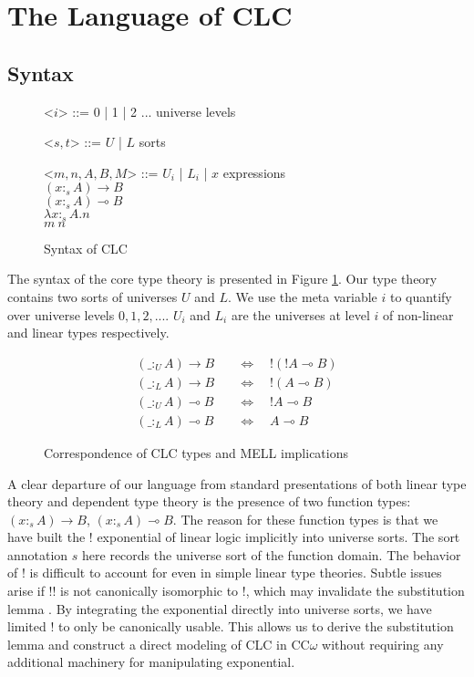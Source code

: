 \documentclass[sigplan,screen,review,anonymous]{acmart}
\newcommand{\indalt}[1][2]{\\\hspace*{-1.2em}\textbar\quad}
\newcommand{\utype}{:_{\scriptscriptstyle U}}
\newcommand{\ltype}{:_{\scriptscriptstyle L}}
\begin{document}
\section{The Language of CLC}
\subsection{Syntax}
\begin{figure}[h]
  \caption{Syntax of CLC}
  \begin{grammar}
    <$i$> ::= 0 | 1 | 2 ... \phantom{* |} \hspace*{3em} universe levels

    <$s, t$> ::= $U$ | $L$ \phantom{| $x$} \hspace*{4.6em} sorts

    <$m, n, A, B, M$> ::= $U_i$ | $L_i$ | $x$ \hspace*{4.2em} expressions
    \indalt $(x :_s A) \rightarrow B$
    \indalt $(x :_s A) \multimap B$
    \indalt $\lambda x :_s A. n$
    \indalt $m\ n$
  \end{grammar}
  \Description{}
  \label{syntax1}
\end{figure}

The syntax of the core type theory is presented in Figure \ref{syntax1}. Our type theory contains two sorts of universes $U$ and $L$. We use the meta variable $i$ to quantify over universe levels $0, 1, 2, ...$. $U_i$ and $L_i$ are the universes at level $i$ of non-linear and linear types respectively.
\begin{figure}[h]
  \caption{Correspondence of CLC types and MELL implications}
  \Description{}
  \begin{align}
    (\_ \utype A) \rightarrow B \quad & \Leftrightarrow \quad !(!A \multimap B) \\
    (\_ \ltype A) \rightarrow B \quad & \Leftrightarrow \quad !(A \multimap B)  \\
    (\_ \utype A) \multimap B \quad   & \Leftrightarrow \quad !A \multimap B    \\
    (\_ \ltype A) \multimap B \quad   & \Leftrightarrow \quad A \multimap B
  \end{align}
  \label{correspondence}
\end{figure}

A clear departure of our language from standard presentations of both linear type theory and dependent type theory is the presence of two function types: $(x :_s A) \rightarrow B$, $(x :_s A) \multimap B$. The reason for these function types is that we have built the ! exponential of linear logic implicitly into universe sorts. The sort annotation $s$ here records the universe sort of the function domain. The behavior of ! is difficult to account for even in simple linear type theories. Subtle issues arise if !! is not canonically isomorphic to !, which may invalidate the substitution lemma \cite{substitute}. By integrating the exponential directly into universe sorts, we have limited ! to only be canonically usable. This allows us to derive the substitution lemma and construct a direct modeling of CLC in CC$\omega$ without requiring any additional machinery for manipulating exponential.
\end{document}
